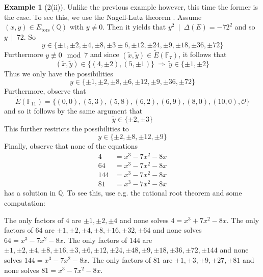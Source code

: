 \documentclass{scrartcl}
\newcommand{\F}{\mathbb{F}}
\newcommand{\Q}{\mathbb{Q}}
\renewcommand{\O}{\mathcal{O}}
\newcommand{\divides}{\ \mid \ }
\theoremstyle{definition}
\newtheorem{example}[subsection]{Example}
\begin{document}
\begin{example}[2(ii)]
    Unlike the previous example however, this time the former is the case.
    To see this, we use the Nagell-Lutz theorem \cite[5.4]{lecture}.
    Assume $(x, y) \in E_{\mathrm{tors}}(\Q)$ with $y \neq 0$.
    Then it yields that $y^2 \divides \Delta(E) = -72^2$ and so $y \divides 72$.
    So
    \begin{equation*}
        y \in \{ \pm 1, \pm 2, \pm 4, \pm 8, \pm 3 \pm 6, \pm 12, \pm 24, \pm 9, \pm 18, \pm 36, \pm 72 \}
    \end{equation*}
    Furthermore $y \not\equiv 0 \mod 7$ and since $(\tilde{x}, \tilde{y}) \in \tilde{E}(\F_7)$, it follows that
    \begin{equation*}
        (\tilde{x}, \tilde{y}) \in \{ (4, \pm 2), (5, \pm 1) \} \ \Rightarrow \ \tilde{y} \in \{ \pm 1, \pm 2 \}
    \end{equation*}
    Thus we only have the possibilities
    \begin{equation*}
        y \in \{ \pm 1, \pm 2, \pm 8, \pm 6, \pm 12, \pm 9, \pm 36, \pm 72 \}
    \end{equation*}
    Furthermore, observe that
    \begin{equation*}
        \tilde{E}(\F_{11}) = \{ (0, 0), (5, 3), (5, 8), (6, 2), (6, 9), (8, 0), (10, 0), \O \}
    \end{equation*}
    and so it follows by the same argument that
    \begin{equation*}
        \tilde{y} \in \{ \pm 2, \pm 3 \}
    \end{equation*}
    This further restricts the possibilities to
    \begin{equation*}
        y \in \{ \pm 2, \pm 8, \pm 12, \pm 9 \}
    \end{equation*}
    Finally, observe that none of the equations
    \begin{align*}
        4 &= x^3 - 7x^2 - 8x \\
        64 &= x^3 - 7x^2 - 8x \\
        144 &= x^3 - 7x^2 - 8x \\
        81 &= x^3 - 7x^2 - 8x
    \end{align*}
    has a solution in $\Q$.
    To see this, use e.g. the rational root theorem and some computation:

    The only factors of $4$ are $\pm 1, \pm 2, \pm 4$ and none solves $4 = x^3 + 7x^2 - 8x$.
    The only factors of $64$ are $\pm 1, \pm 2, \pm 4, \pm 8, \pm 16, \pm 32, \pm 64$ and none solves $64 = x^3 - 7x^2 - 8x$.
    The only factors of $144$ are $\pm 1, \pm 2, \pm 4, \pm 8, \pm 16, \pm 3, \pm 6, \pm 12, \pm 24, \pm 48, \pm 9, \pm 18, \pm 36, \pm 72, \pm 144$ and none solves $144 = x^3 - 7x^2 - 8x$.
    The only factors of $81$ are $\pm 1, \pm 3, \pm 9, \pm 27, \pm 81$ and none solves $81 = x^3 - 7x^2 - 8x$.


\end{example}
\end{document}
